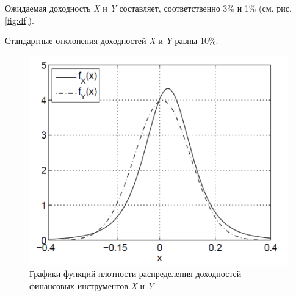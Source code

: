 \documentclass[_fin_decisions_lectures.tex]{subfiles}
\begin{document}
\begin{frame}[shrink=15]
Ожидаемая доходность \textit{X }и \textit{Y} составляет, соответственно 3\% и 1\% (см. рис. \autoref{fig:df}).

Стандартные отклонения доходностей \textit{X} и \textit{Y} равны 10\%.
\begin{figure}
	\centering
	\includegraphics[scale=0.6]{img/expected_shortfall_df.png}
	\caption{Графики функций плотности распределения доходностей финансовых инструментов \textit{X }и \textit{Y}}
	\label{fig:df}	
\end{figure}
\end{frame}
\end{document}
